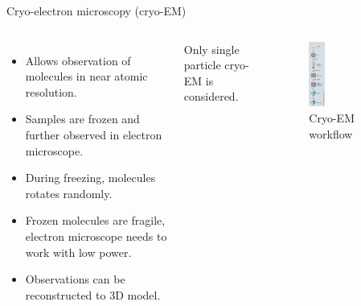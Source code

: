 \documentclass[aspectratio=169]{beamer}
\begin{document}
\begin{frame}[c]{Cryo-electron microscopy (cryo-EM)}
    \begin{columns}[c]
            \begin{itemize}
                \item Allows observation of molecules in near atomic resolution.
                \item Samples are frozen and further observed in electron microscope.
                \item During freezing, molecules rotates randomly.
                \item Frozen molecules are fragile, electron microscope needs to work with low power.
                \item Observations can be reconstructed to 3D model.
            \end{itemize}

            \begin{tcolorbox}[colback=red!5!white,hide=<-1>, alert=<2>, colframe=red!75!black]
                Only single particle cryo-EM is considered.
            \end{tcolorbox}
        \begin{figure}
            \includegraphics[width=0.22\textwidth]{cryo-em-workflow.png}
            \caption{Cryo-EM workflow \cite[Figure]{singleParticleCryoEm}}
        \end{figure}
    \end{columns}
\end{frame}
\end{document}
